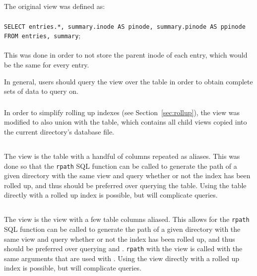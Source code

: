 \subsection{\pentries}
The original \pentries view was defined as:
\\\\
\texttt{SELECT entries.*, summary.inode AS pinode, summary.pinode AS
  ppinode FROM entries, summary};
\\\\
This was done in order to not store the parent inode of each entry,
which would be the same for every entry.

In general, users should query the \pentries view over the \entries
table in order to obtain complete sets of data to query on.

\subsubsection{\pentriesrollup}
In order to simplify rolling up indexes (see
Section~\ref{sec:rollup}), the \pentries view was modified to also
union with the \pentriesrollup table, which contains all child
\pentries views copied into the current directory's database file.

\subsection{\vrsummary}
The \vrsummary view is the \summary table with a handful of columns
repeated as aliases. This was done so that the \texttt{rpath} SQL
function can be called to generate the path of a given directory with
the same view and query whether or not the index has been rolled up,
and thus should be preferred over querying the \summary table. Using
the \summary table directly with a rolled up index is possible, but
will complicate queries.

\subsection{\vrpentries}
The \vrpentries view is the \pentries view with a few \summary table
columns aliased. This allows for the \texttt{rpath} SQL function can
be called to generate the path of a given directory with the same view
and query whether or not the index has been rolled up, and thus should
be preferred over querying \entries and \pentries. \texttt{rpath} with
the \vrpentries view is called with the same arguments that are used
with \vrsummary. Using the \pentries view directly with a rolled up
index is possible, but will complicate queries.

